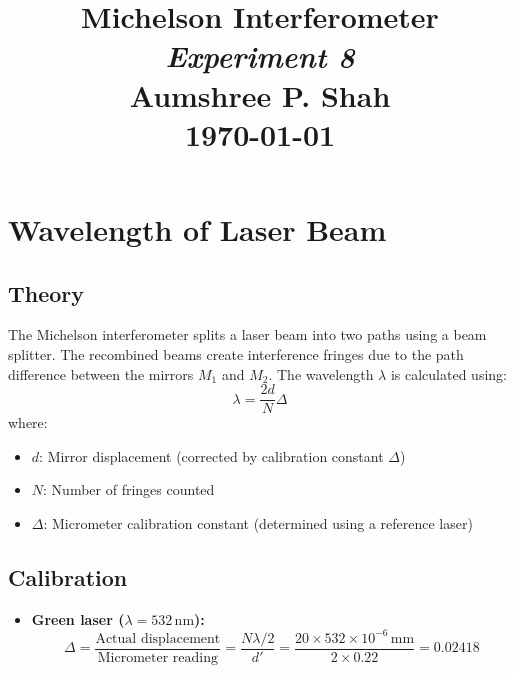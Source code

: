 \documentclass{article}
\title{
    \vspace{-2cm}
    \textbf{ Michelson Interferometer} \\
    \large\textit{Experiment 8} \\
    \vspace{0.5cm}
    \large Aumshree P. Shah \\
    \large \today
}
\author{}
\date{}
\begin{document}
\maketitle
\thispagestyle{empty}

\tableofcontents
\clearpage

\setcounter{page}{1}

\section{Wavelength of Laser Beam}
\subsection{Theory}
The Michelson interferometer splits a laser beam into two paths using a beam splitter. The recombined beams create interference fringes due to the path difference between the mirrors \( M_1 \) and \( M_2 \). The wavelength \( \lambda \) is calculated using:
\[
\lambda = \frac{2d}{N} \Delta
\]
where:
\begin{itemize}
    \item \( d \): Mirror displacement (corrected by calibration constant \( \Delta \))
    \item \( N \): Number of fringes counted
    \item \( \Delta \): Micrometer calibration constant (determined using a reference laser)
\end{itemize}

\subsection{Calibration}
\begin{itemize}
    \item \textbf{Green laser (\( \lambda = 532 \, \text{nm} \)):} 
    \[
    \Delta = \frac{\text{Actual displacement}}{\text{Micrometer reading}} = \frac{N \lambda / 2}{d'} = \frac{20 \times 532 \times 10^{-6} \, \text{mm}}{2 \times 0.22} = 0.02418
    \]
\end{itemize}
\end{document}
